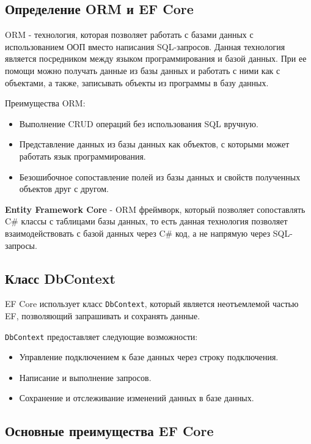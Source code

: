 \documentclass[a4paper,12pt]{report}
\begin{document}
\subsection{Определение \acs{ORM} и \acs{EF} Core}

\acs{ORM} - технология, которая позволяет работать с базами данных с использованием \acs{ООП} вместо написания \acs{SQL}-запросов. 
Данная технология является посредником между языком программирования и базой данных. 
При ее помощи можно получать данные из базы данных и работать с ними как с объектами, 
а также, записывать объекты из программы в базу данных.\cite{orm}

Преимущества \acs{ORM}:
\begin{itemize}
    \item
        Выполнение \acs{CRUD} операций без использования \acs{SQL} вручную.
    \item
        Представление данных из базы данных как объектов, с которыми может работать язык программирования.
    \item
        Безошибочное сопоставление полей из базы данных и свойств полученных объектов друг с другом.
\end{itemize}

\textbf{Entity Framework Core} - \acs{ORM} фреймворк, который позволяет сопоставлять C\# классы с таблицами базы данных, 
то есть данная технология позволяет взаимодействовать с базой данных через C\# код, а не напрямую через \acs{SQL}-запросы.\cite{ef_core}


\subsection{Класс DbContext}

\acs{EF} Core использует класс \texttt{DbContext}, который является неотъемлемой частью \acs{EF}, позволяющий запрашивать и сохранять данные. 

\texttt{DbContext} предоставляет следующие возможности:
\begin{itemize}
    \item
        Управление подключением к базе данных через строку подключения.
    \item 
        Написание и выполнение запросов.
    \item
        Сохранение и отслеживание изменений данных в базе данных.
\end{itemize}

\subsection{Основные преимущества \acs{EF} Core}
\end{document}
